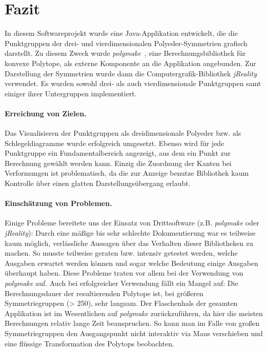 \section{Fazit}
In diesem Softwareprojekt wurde eine Java-Applikation entwickelt, die die Punktgruppen der drei- und vierdimensionalen
Polyeder-Symmetrien grafisch darstellt. Zu diesem Zweck wurde \emph{polymake}~\cite{polymake}, eine Berechnungsbibliothek für
konvexe Polytope, als externe Komponente an die Applikation angebunden. Zur Darstellung der Symmetrien wurde dann die Computergrafik-Bibliothek
\emph{jReality}~\cite{jreality} verwendet.
Es wurden sowohl drei- als auch vierdimensionale Punktgruppen samt einiger ihrer Untergruppen implementiert.

\paragraph{Erreichung von Zielen.}
Das Visualisieren der Punktgruppen als dreidimensionale Polyeder bzw. als Schlegeldiagramme wurde erfolgreich umgesetzt. Ebenso wird für jede Punktgruppe ein Fundamentalbereich angezeigt, aus dem ein Punkt zur Berechnung gewählt werden kann. 
Einzig die Zuordnung der Kanten bei Verformungen ist problematisch, da die zur Anzeige benutze Bibliothek kaum Kontrolle über
einen glatten Darstellungsübergang erlaubt.

\paragraph{Einschätzung von Problemen.}
Einige Probleme bereitete uns der Einsatz von Drittsoftware (z.B. \emph{polymake} oder \emph{jReality}): Durch eine mäßige bis sehr schlechte
Dokumentierung war es teilweise kaum möglich, verlässliche Aussagen über das Verhalten dieser Bibliotheken zu machen. So musste teilweise geraten bzw. intensiv getestet werden, welche Ausgaben erwartet werden können und sogar welche Bedeutung einige Ausgaben überhaupt haben. Diese Probleme traten vor allem bei der Verwendung von \emph{polymake} auf.
Auch bei erfolgreicher Verwendung fällt ein Mangel auf: Die Berechnungsdauer der resultierenden Polytope ist, bei größeren Symmetriegruppen (> 250), sehr langsam. Der Flaschenhals der gesamten Applikation ist im Wesentlichen auf \emph{polymake} zurückzuführen, da hier die meisten Berechnungen relativ lange Zeit beanspruchen. So kann man im Falle von großen Symmetriegruppen den Ausgangspunkt nicht interaktiv via Maus
verschieben und eine flüssige Transformation des Polytops beobachten.

